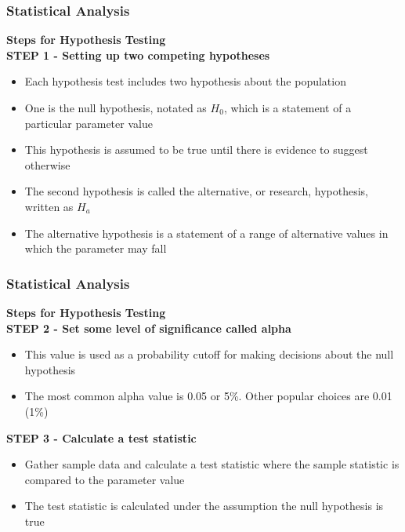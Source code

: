 \documentclass{beamer}
\begin{document}

\begin{frame}
\frametitle{Statistical Analysis}
\textbf{Steps for Hypothesis Testing}\\
\vspace{0.5cm}
\textbf{STEP 1 - Setting up two competing hypotheses}
\vspace{0.2cm}
\begin{itemize}
\item Each hypothesis test includes two hypothesis about the population
\vspace{0.2cm}
\item One is the null hypothesis, notated as $H_0$, which is a statement of a particular parameter value
\vspace{0.2cm}
\item This hypothesis is assumed to be true until there is evidence to suggest otherwise
\vspace{0.2cm}
\item The second hypothesis is called the alternative, or research, hypothesis, written as $H_a$
\vspace{0.2cm}
\item The alternative hypothesis is a statement of a range of alternative values in which the parameter may fall
\end{itemize}
\end{frame}


\begin{frame}
\frametitle{Statistical Analysis}
\textbf{Steps for Hypothesis Testing}\\
\vspace{0.5cm}
\textbf{STEP 2 - Set some level of significance called alpha}
\vspace{0.2cm}
\begin{itemize}
\item This value is used as a probability cutoff for making decisions about the null hypothesis
\vspace{0.2cm}
\item The most common alpha value is 0.05  or 5\%. Other popular choices are 0.01 (1\%)
\end{itemize}
\vspace{0.2cm}
\textbf{STEP 3 - Calculate a test statistic}
\vspace{0.2cm}
\begin{itemize}
\item Gather sample data and calculate a test statistic where the sample statistic is compared to the parameter value
\vspace{0.2cm}
\item The test statistic is calculated under the assumption the null hypothesis is true
\end{itemize}
\end{frame}
\end{document}
